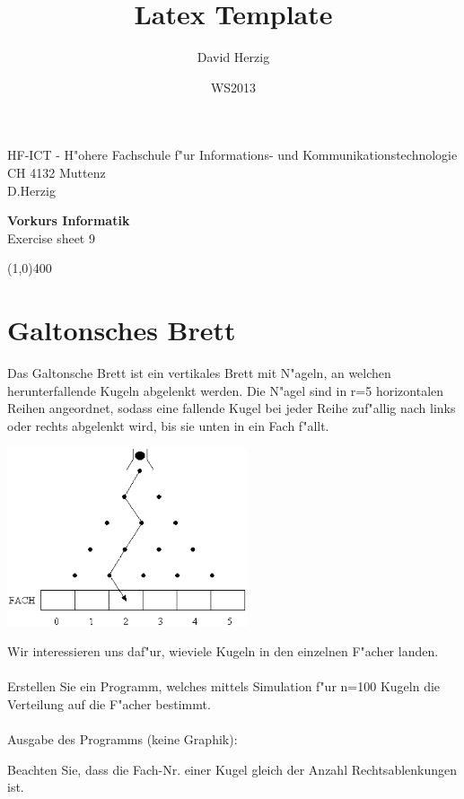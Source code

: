 \documentclass[a4paper,10pt]{article}
\title{Latex Template}
\author{David Herzig}
\date{WS2013}
\begin{document}
HF-ICT - H"ohere Fachschule f"ur Informations- und Kommunikationstechnologie\\
CH 4132 Muttenz\\
D.Herzig

\vspace{2mm}

\begin{center}
{\Large \bf Vorkurs Informatik}\\
Exercise sheet 9
\end{center}

\vspace{2mm}

\line(1,0){400}

\vspace{5mm}

\section{Galtonsches Brett}
Das Galtonsche Brett ist ein vertikales Brett mit N"ageln, an welchen herunterfallende Kugeln abgelenkt werden. Die N"agel sind in r=5 horizontalen Reihen angeordnet, sodass eine fallende Kugel bei jeder Reihe zuf"allig nach links oder rechts abgelenkt wird, bis sie unten in ein Fach f"allt.

\vspace{5mm}

\includegraphics[width=200pt]{brett.eps}

\vspace{5mm}

Wir interessieren uns daf"ur, wieviele Kugeln in den einzelnen F"acher landen.\\
\\
Erstellen Sie ein Programm, welches mittels Simulation f"ur n=100 Kugeln die Verteilung auf die F"acher bestimmt.\\
\\
Ausgabe des Programms (keine Graphik):



Beachten Sie, dass die Fach-Nr. einer Kugel gleich der Anzahl Rechtsablenkungen ist.
\end{document}
